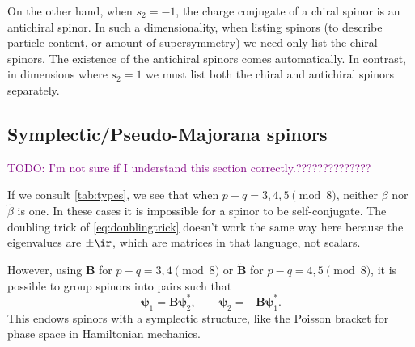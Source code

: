 \documentclass[11pt]{article}
\newcommand{\todo}[1]{\textcolor{purple}{TODO: #1}}
\newcommand{\B}{\mathbf{B}}
\newcommand{\Bt}{\widetilde{\B}}
\newcommand{\psib}{\boldsymbol{\psi}}
\newcommand{\betat}{\tilde{\beta}}
\begin{document}
On the other hand, when \(s_2 = -1\), the charge conjugate of a chiral spinor is an antichiral spinor.
In such a dimensionality, when listing spinors (\eg to describe particle content, or amount of supersymmetry) we need only list the chiral spinors.
The existence of the antichiral spinors comes automatically.
In contrast, in dimensions where \(s_2 = 1\) we must list both the chiral and antichiral spinors separately.



\subsection{Symplectic/Pseudo-Majorana spinors}\label{sec:symplecticmajorana}

\todo{I'm not sure if I understand this section correctly.??????????????}

If we consult \cref{tab:types}, we see that when \( p-q = 3,4,5 \pmod 8 \), neither $\beta$ nor $\betat$ is one.
In these cases it is impossible for a spinor to be self-conjugate.
The doubling trick of \cref{eq:doublingtrick} doesn't work the same way here because the eigenvalues are $\pm\ir$, which are matrices in that language, not scalars.

However, using \(\B\) for \( p-q = 3,4 \pmod 8 \) or \(\Bt\) for \( p-q = 4,5 \pmod 8 \), it is possible to group spinors into pairs such that
%
\begin{equation}\label{eq:pseudomajorana}
  \psib_1 = \B \psib_2^\ast,
  \qquad
  \psib_2 = - \B \psib_1^\ast.
\end{equation}
%
This endows spinors with a symplectic structure, like the Poisson bracket for phase space in Hamiltonian mechanics.
\end{document}

